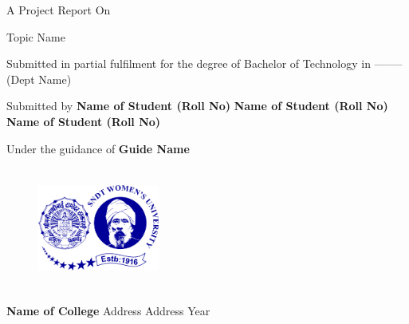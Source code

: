 
\begin{center}
A Project Report On

\LARGE{Topic Name}

\end{center}

\vspace{3cm}

\begin{center}

Submitted in partial fulfilment for the
\linebreak degree of Bachelor of Technology in 
\linebreak  --------(Dept Name)
\end{center}
\vspace{2cm}
\begin{center}

Submitted by
\linebreak \textbf{Name of Student (Roll No)}
\linebreak \textbf{Name of Student (Roll No)}
\linebreak \textbf{Name of Student (Roll No)}

\vspace{0.5cm}

 Under the guidance of
\linebreak \textbf{Guide Name}
\end{center} 

\vspace{1cm}
\begin{center}

\vspace{0.5cm}
 


\vspace{0.1cm}
\begin{figure}[!h]
	\begin{center}
		\includegraphics[width=4cm,height=4cm,keepaspectratio]{SNDT_logo.pdf}
	\end{center}
\end{figure}
\vspace{0.1cm}

 \textbf{Name of College}
\linebreak Address 
\linebreak Address
\linebreak Year
\end{center}


%
